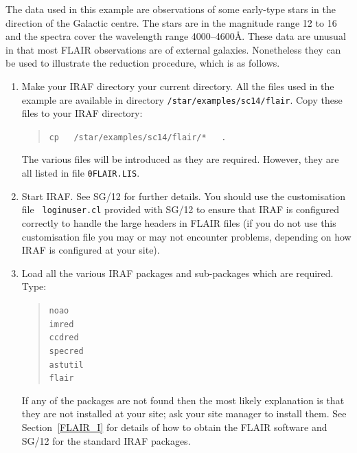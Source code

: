 \documentclass[twoside,11pt]{article}
\newcommand{\xref}[3]{#1}
\begin{document}
The data used in this example are observations of some early-type
stars in the direction of the Galactic centre.  The stars are in
the magnitude range 12 to 16 and the spectra cover the wavelength
range 4000--4600\AA.  These data are unusual in that most FLAIR
observations are of external galaxies.  Nonetheless they can be used
to illustrate the reduction procedure, which is as follows.

\begin{enumerate}

  \item Make your IRAF directory your current directory.  All
   the files used in the example are available in directory
   {\tt /star/examples/sc14/flair}.  Copy these files to your
   IRAF directory:

  \begin{quote}
   {\tt cp ~ /star/examples/sc14/flair/* ~ .}
  \end{quote}

   The various files will be introduced as they are required.
   However, they are all listed in file {\tt 0FLAIR.LIS}.

  \item Start IRAF.  See \xref{SG/12}{sg12}{} for further
   details.  You should use the customisation file {\tt \newline
   loginuser.cl} provided with SG/12 to ensure that IRAF
   is configured correctly to handle the large headers in
   FLAIR files (if you do not use this customisation file you
   may or may not encounter problems, depending on how IRAF is
   configured at your site).

  \item Load all the various IRAF packages and sub-packages
   which are required.  Type:

  \begin{quote}
   {\tt noao \\
   imred     \\
   ccdred    \\
   specred   \\
   astutil   \\
   flair}
  \end{quote}

   If any of the packages are not found then the most likely
   explanation is that they are not installed at your site;
   ask your site manager to install them.  See Section~\ref{FLAIR_I}
   for details of how to obtain the FLAIR software and
   \xref{SG/12}{sg12}{} for the standard IRAF packages.


\end{enumerate}
\end{document}
